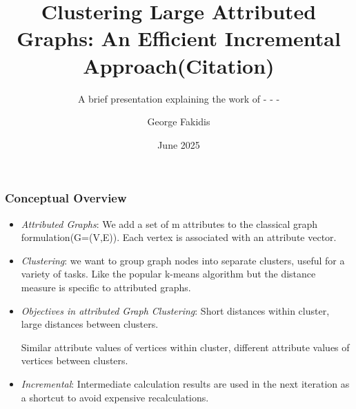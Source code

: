 \documentclass[]{beamer}
\title{Clustering Large Attributed Graphs: An Efficient Incremental Approach(Citation)}
\subtitle{A brief presentation explaining the work of - - -}
\author{George Fakidis}
\date{June 2025}
\institute[]{Athens University of Economics and Business}
\begin{document}
	
	\frame{\titlepage}
	\begin{frame}
		\frametitle{Conceptual Overview}
		\begin{itemize}
			\item \emph{Attributed Graphs}: We add a set of m attributes to the classical graph formulation(G=(V,E)). Each vertex is associated with an attribute vector.
			\item \emph{Clustering}: we want to group graph nodes into separate clusters, useful for a variety of tasks. Like the popular k-means algorithm but the distance measure is specific to attributed graphs.
			\item \emph{Objectives in attributed Graph Clustering}: Short distances within cluster, large distances between clusters. 
			
			Similar attribute values of vertices within cluster, different attribute values of vertices between clusters.
			
			\item \emph{Incremental}: Intermediate calculation results are used in the next iteration as a shortcut to avoid expensive recalculations.
		\end{itemize}
	\end{frame}
\end{document}
